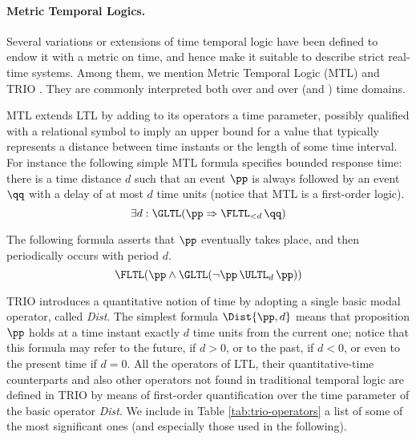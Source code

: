 \paragraph{Metric Temporal Logics.}
Several variations or extensions of  time temporal logic have
been defined to endow it with a metric on time, and hence make it
suitable to describe strict real-time systems. Among them, we mention
Metric Temporal Logic (MTL) \cite{Koy90} and TRIO \cite{GMM90,MMG92}.
They are commonly interpreted both over  and over  (and
) time domains.

MTL extends LTL by adding to its operators a  time
parameter, possibly qualified with a relational symbol to imply an
upper bound for a value that typically represents a distance between
time instants or the length of some time interval.  For instance the
following simple MTL formula specifies bounded response time: there is
a time distance $d$ such that an event $\pp$ is always followed by an
event $\qq$ with a delay of at most $d$ time units (notice that MTL is
a first-order logic).
\begin{equation} \label{eq:MTL}
  \exists d: \GLTL ( \pp \Rightarrow \FLTL_{< d} \,\qq)
\end{equation}

The following formula asserts that $\pp$ eventually takes place, and then periodically occurs with period $d$.
\begin{equation*}
  \FLTL ( \pp \wedge \GLTL (\neg \pp \, \ULTL_d \, \pp) )
\end{equation*}

TRIO introduces a quantitative notion of time by adopting a single 
basic modal operator, called \emph{Dist}. The simplest formula $\Dist{\pp, d}$
means that proposition $\pp$ holds at a time instant exactly $d$
time units from the current one; notice that this formula may 
refer to the future, if $d > 0$, or to the past, if $d < 0$, 
or even to the present time if $d = 0$. All the operators of 
LTL, their quantitative-time counterparts and also other operators 
not found in traditional temporal logic are defined in TRIO by 
means of first-order quantification over the time parameter of 
the basic operator \emph{Dist}. We include in Table \ref{tab:trio-operators} a list of some 
of the most significant ones (and especially those used in the following).

